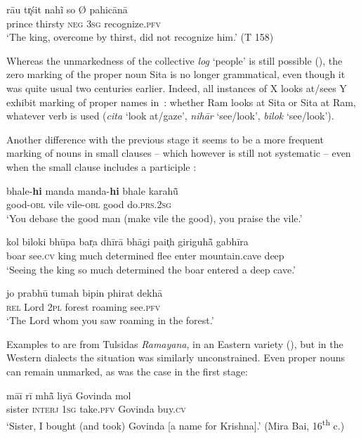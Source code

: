 \documentclass[output=paper]{LSP/langsci}
\begin{document}
\ex \label{10-mo-ex:37b}
\gll rāu tr̥śit nahĩ so Ø pahicānā\\
 prince thirsty \textsc{neg} \textsc{3sg} { } recognize.\textsc{pfv}\\
\glt ‘The king, overcome by thirst, did not recognize him.’ (T 158)
\z
\z

Whereas the unmarkedness of the collective \textit{log} ‘people’ is still possible (\cf {}), the zero marking of the proper noun Sita is no longer grammatical, even though it was quite usual two centuries earlier. Indeed, all instances of X looks at/sees Y exhibit marking of proper names in~: whether Ram looks at Sita or Sita at Ram, whatever verb is used (\textit{cita} ‘look at/gaze’, \textit{nihār} ‘see/look’, \textit{bilok} ‘see/look’). 

Another difference with the previous stage it seems to be a more frequent marking of nouns in small clauses  – which however is still not systematic  – even when the small clause includes a participle : 

\ea
\label{10-mo-ex:38}
\gll  bhale-\textbf{hi} manda manda-\textbf{hi} bhale 	karahū̃\\
 good-\textsc{obl} vile vile-\textsc{obl} good do.\textsc{prs.2sg}\\
\glt ‘You debase the good man (make vile the good), you praise the vile.’
\z

\ea
\label{10-mo-ex:39}
\gll  kol biloki bhūpa bar̩a dhīrā bhāgi pait̩h giriguhā̃ 	 gabhīra\\
 boar see.\textsc{cv} king much determined flee enter mountain.cave deep\\
\glt ‘Seeing the king so much determined the boar entered a deep cave.’
\z

\ea
\label{10-mo-ex:40}
\gll  jo prabhū tumah bipin phirat dekhā\\
\textsc{rel} Lord \textsc{2pl} forest roaming see.\textsc{pfv}\\
\glt ‘The Lord whom you saw roaming in the forest.’ %
\z

Examples  to  are from Tulsidas \textit{Ramayana}, in an Eastern variety (), but in the Western dialects the situation was similarly unconstrained. Even proper nouns can remain unmarked, as was the case in the first stage:

\ea
\label{10-mo-ex:41}
\gll māī rī mhā̃ liyā Govinda mol\\
 sister \textsc{interj} \textsc{1sg} take.\textsc{pfv} Govinda buy.\textsc{cv}\\
\glt ‘Sister, I bought (and took) Govinda [a name for Krishna].’ (Mira Bai, 16\textsuperscript{th} c.)
\z
\end{document}
